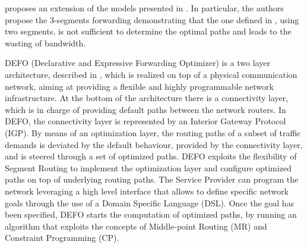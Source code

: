 \cite{roomi2018semi} proposes an extension of the models presented in \cite{optimizedte}. In particular, the authors propose the 3-segments forwarding demonstrating that the one defined in \cite{optimizedte}, using two segments, is not sufficient to determine the optimal paths and leads to the wasting of bandwidth. %

DEFO (Declarative and Expressive Forwarding Optimizer) is a two layer architecture, described in \cite{defo1}, which is realized on top of a physical communication network, aiming at providing a flexible and highly programmable network infrastructure.
At the bottom of the architecture there is a connectivity layer, which is in charge of providing default paths between the network routers.
In DEFO, the connectivity layer is represented by an Interior Gateway Protocol (IGP).
By means of an optimization layer, the routing paths of a subset of traffic demands is deviated by the default behaviour, provided by the connectivity layer, and is steered through a set of optimized paths.
DEFO exploits the flexibility of Segment Routing to implement the optimization layer and configure optimized paths on top of underlying routing paths.
The Service Provider can program the network leveraging a high level interface that allows to define specific network goals through the use of a Domain Specific Language (DSL).
Once the goal has been specified, DEFO starts the computation of optimized paths, by running an algorithm that exploits the concepts of Middle-point Routing (MR) and Constraint Programming (CP).

